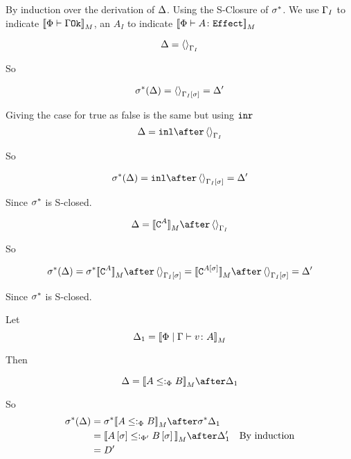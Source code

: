 \documentclass{report}
\begin{document}
\proof
By induction over the derivation of $\Delta$. Using the S-Closure of $\sigma^*$. We use $\Gamma_I$ to indicate ${\bf [\![}\Phi\vdash \Gamma \texttt{Ok}{\bf ]\!]}_M$, an $A_I$ to indicate ${\bf [\![}\Phi \vdash A \colon \texttt{Effect}{\bf ]\!]}_M$


\begin{equation}
    \Delta = \left\langle\right\rangle_{\Gamma_I}
\end{equation}

So

\begin{equation}
    \sigma^*(\Delta) = \left\langle\right\rangle_{\Gamma_I\left[\sigma\right]} = \Delta'
\end{equation}

Giving the case for true as false is the same but using $\texttt{inr}$
\begin{equation}
    \D = \inl\after\term{\G_I}
\end{equation}

So

\begin{equation}
    \si\star(\D) = \inl\after \term{\G_I\ssi} = \D'
\end{equation}

Since $\sigma^*$ is S-closed.



\begin{equation}
    \D = \deno{\const{A}}\after\term{\G_I}
\end{equation}

So

\begin{equation}
    \si\star(\D) = \si\star\deno{\const{A}}\after \term{\G_I\ssi}=\deno{\const{A\ssi}}\after \term{\G_I\ssi}  = \D'
\end{equation}

Since $\sigma^*$ is S-closed.


Let \begin{equation}
    \Delta_1 = {\bf [\![}\Phi\mid\Gamma \vdash v \colon A{\bf ]\!]}_M
\end{equation}

Then

\begin{equation}
    \D = \deno{A\subtypep B}\after \D_1\\
\end{equation}

So 
\begin{align}
    \si\star(\D) & = \si\star{\deno{A\subtypep B}}\after\si\star\D_1 \\
    & = \deno{A\ssi\subtypepp B\ssi}\after\D_1'\qt{By induction}\\
    & = D'
\end{align}
\end{document}
